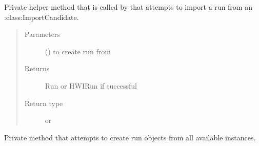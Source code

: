 \documentclass[letterpaper,10pt,english]{sphinxmanual}
\begin{document}
\begin{fulllineitems}
\begin{fulllineitems}
\begin{quote}
\begin{description}
\end{description}\end{quote}

\end{fulllineitems}


\begin{fulllineitems}
\label{\detokenize{polo.windows:polo.windows.run_importer.RunImporterDialog._import_run}}
Private helper method that is called by
{\hyperref[\detokenize{polo.windows:polo.windows.run_importer.RunImporterDialog._import_runs}]{}} that
attempts to import a run from an :class:{\color{red}\bfseries{}\textasciigrave{}}ImportCandidate.
\begin{quote}\begin{description}
\item[{Parameters}] \leavevmode
{} ({\hyperref[\detokenize{polo.windows:polo.windows.run_importer.ImportCandidate}]{}}) \textendash{} {\hyperref[\detokenize{polo.windows:polo.windows.run_importer.ImportCandidate}]{}} to create run from

\item[{Returns}] \leavevmode
Run or HWIRun if successful

\item[{Return type}] \leavevmode
{\hyperref[\detokenize{polo.crystallography:polo.crystallography.run.Run}]{}} or {\hyperref[\detokenize{polo.crystallography:polo.crystallography.run.HWIRun}]{}}

\end{description}\end{quote}

\end{fulllineitems}


\begin{fulllineitems}
\label{\detokenize{polo.windows:polo.windows.run_importer.RunImporterDialog._import_runs}}
Private method that attempts to create run objects from all available
{\hyperref[\detokenize{polo.windows:polo.windows.run_importer.ImportCandidate}]{}} instances.


\end{fulllineitems}
\end{fulllineitems}
\end{document}

